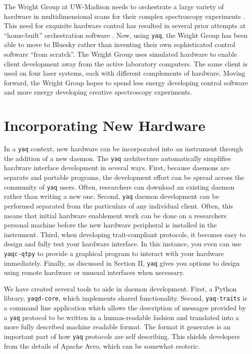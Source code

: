 \documentclass[aip, amsmath, amssymb, reprint,]{revtex4-1}
\newcommand\yaq{\texttt{yaq}}
\begin{document}
The Wright Group at UW-Madison needs to orchestrate a large variety of hardware in multidimensional scans for their complex spectroscopy experiments \cite{MukamelShaul2000a, WrightJohnCurtis2011a}.
This need for exquisite hardware control has resulted in several prior attempts at ``home-built'' orchestration software \cite{CarlsonRogerJohn1988a, MeyerKentAlbert2004b, KainSchuyler2017a, ThompsonBlaiseJonathan2018a}.
Now, using \yaq{}, the Wright Group has been able to move to Bluesky rather than inventing their own sophisticated control software ``from scratch''.
The Wright Group uses simulated hardware to enable client development away from the active laboratory computers.
The same client is used on four laser systems, each with different complements of hardware.
Moving forward, the Wright Group hopes to spend less energy developing control software and more energy developing creative spectroscopy experiments.



\section{Incorporating New Hardware}

In a \yaq{} context, new hardware can be incorporated into an instrument through the addition of a new daemon.
The \yaq{} architecture automatically simplifies hardware interface development in several ways.
First, because daemons are separate and portable programs, the development effort can be spread across the community of \yaq{} users.
Often, researchers can download an existing daemon rather than writing a new one.
Second, \yaq{} daemon development can be performed separated from the particulars of any individual client.
Often, this means that initial hardware enablement work can be done on a researchers personal machine before the new hardware peripheral is installed in the instrument.
Third, when developing trait-compliant protocols, it becomes easy to design and fully test your hardware interface.
In this instance, you even can use \texttt{yaqc-qtpy} to provide a graphical program to interact with your hardware immediately.
Finally, as discussed in Section II, \yaq{} gives you options to design using remote hardware or unusual interfaces when necessary.

We have created several tools to aide in daemon development.
First, a Python library, \texttt{yaqd-core}\cite{yaqd-core-python}, which implements shared functionality.
Second, \texttt{yaq-traits}\cite{yaq-traits} is a command line application which allows the description of messages provided by a \yaq{} protocol to be written in a human-readable fashion and translated into a more fully described machine readable format.
The format it generates is an important part of how \yaq{} protocols are self describing.
This shields developers from the details of Apache Avro, which can be somewhat esoteric.
\end{document}
